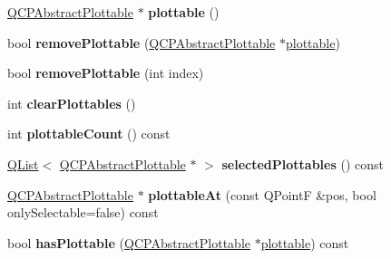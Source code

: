 \begin{DoxyCompactItemize}
\item 
\hyperlink{class_q_c_p_abstract_plottable}{Q\+C\+P\+Abstract\+Plottable} $\ast$ {\bfseries plottable} ()\hypertarget{class_q_custom_plot_ac47df4ac8bc180c8771083ecb599eaeb}{}\label{class_q_custom_plot_ac47df4ac8bc180c8771083ecb599eaeb}

\item 
bool {\bfseries remove\+Plottable} (\hyperlink{class_q_c_p_abstract_plottable}{Q\+C\+P\+Abstract\+Plottable} $\ast$\hyperlink{class_q_custom_plot_a32de81ff53e263e785b83b52ecd99d6f}{plottable})\hypertarget{class_q_custom_plot_af3dafd56884208474f311d6226513ab2}{}\label{class_q_custom_plot_af3dafd56884208474f311d6226513ab2}

\item 
bool {\bfseries remove\+Plottable} (int index)\hypertarget{class_q_custom_plot_afc210e0021480f8119bccf37839dbcc8}{}\label{class_q_custom_plot_afc210e0021480f8119bccf37839dbcc8}

\item 
int {\bfseries clear\+Plottables} ()\hypertarget{class_q_custom_plot_a9a409bb3201878adb7ffba1c89c4e004}{}\label{class_q_custom_plot_a9a409bb3201878adb7ffba1c89c4e004}

\item 
int {\bfseries plottable\+Count} () const \hypertarget{class_q_custom_plot_a2dbfbf15dc38713f9a1c445a3dd2e989}{}\label{class_q_custom_plot_a2dbfbf15dc38713f9a1c445a3dd2e989}

\item 
\hyperlink{class_q_list}{Q\+List}$<$ \hyperlink{class_q_c_p_abstract_plottable}{Q\+C\+P\+Abstract\+Plottable} $\ast$ $>$ {\bfseries selected\+Plottables} () const \hypertarget{class_q_custom_plot_a1570cbbeec04f2852ede0ffb9ee92811}{}\label{class_q_custom_plot_a1570cbbeec04f2852ede0ffb9ee92811}

\item 
\hyperlink{class_q_c_p_abstract_plottable}{Q\+C\+P\+Abstract\+Plottable} $\ast$ {\bfseries plottable\+At} (const Q\+PointF \&pos, bool only\+Selectable=false) const \hypertarget{class_q_custom_plot_abcdc51f5fa3078f6dd12688bfa64f5ea}{}\label{class_q_custom_plot_abcdc51f5fa3078f6dd12688bfa64f5ea}

\item 
bool {\bfseries has\+Plottable} (\hyperlink{class_q_c_p_abstract_plottable}{Q\+C\+P\+Abstract\+Plottable} $\ast$\hyperlink{class_q_custom_plot_a32de81ff53e263e785b83b52ecd99d6f}{plottable}) const \hypertarget{class_q_custom_plot_a4fc28914e2ee91aab424b7ce46b6bdf1}{}\label{class_q_custom_plot_a4fc28914e2ee91aab424b7ce46b6bdf1}


\end{DoxyCompactItemize}
